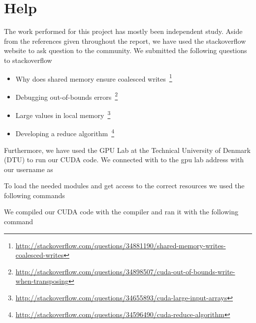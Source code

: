 \section{Help}
\label{sec:help}

The work performed for this project has mostly been independent study.
Aside from the references given throughout the report, we have used the stackoverflow website to ask question to the community.
We submitted the following questions to stackoverflow

\begin{itemize}
  \item Why does shared memory ensure coalesced writes~\footnote{\href{http://stackoverflow.com/questions/34881190/shared-memory-writes-coalesced-writes}{http://stackoverflow.com/questions/34881190/shared-memory-writes-coalesced-writes}}
  \item Debugging out-of-bounds errors~\footnote{\href{http://stackoverflow.com/questions/34898507/cuda-out-of-bounds-write-when-transposing}{http://stackoverflow.com/questions/34898507/cuda-out-of-bounds-write-when-transposing}}
  \item Large values in local memory~\footnote{\href{http://stackoverflow.com/questions/34655893/cuda-large-input-arrays}{http://stackoverflow.com/questions/34655893/cuda-large-input-arrays}}
  \item Developing a reduce algorithm~\footnote{\href{http://stackoverflow.com/questions/34596490/cuda-reduce-algorithm}{http://stackoverflow.com/questions/34596490/cuda-reduce-algorithm}}
\end{itemize}

Furthermore, we have used the GPU Lab at the Technical University of Denmark (DTU) to run our CUDA code.
We connected with  to the gpu lab address with our username as 
%
\begin{quote}
\end{quote}
%
To load the needed modules and get access to the correct resources we used the following commands
%
\begin{quote}
\end{quote}
%
We compiled our CUDA code with the  compiler and ran it with the following command
%
\begin{quote}
\end{quote}
